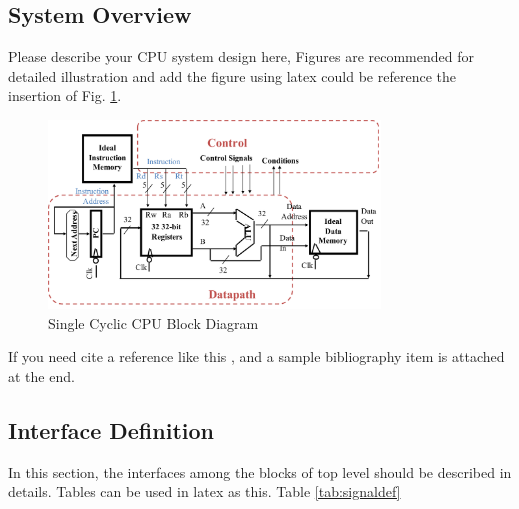 \documentclass[a4paper]{article}
\begin{document}
\subsection{System Overview}\label{sub:sysover}
Please describe your CPU system design here, Figures are recommended for detailed illustration and add the figure using latex could be reference the insertion of Fig. \ref{fig:singleblock}. 
\begin{figure}[ht]
 \centering
 \includegraphics[height=5cm]{images/l1sys.pdf}
 \caption{Single Cyclic CPU Block Diagram}
 \label{fig:singleblock}
\end{figure}
If you need cite a reference like this \cite{Erdos01}, and a sample bibliography item is attached at the end.
\subsection{Interface Definition}\label{sub:Interface}
In this section, the interfaces among the blocks of top level should be described in details. Tables can be used in latex as this. Table \ref{tab:signaldef}
\end{document}
